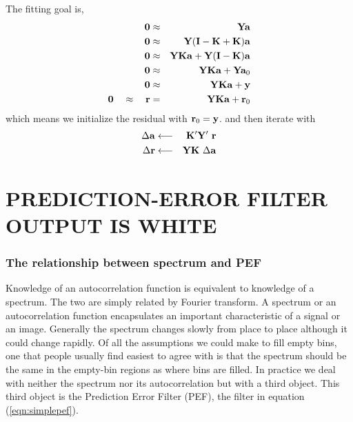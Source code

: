 The fitting goal is,
\begin{eqnarray}
\bold 0  &\approx & \bold Y                          \bold a            \\
\bold 0  &\approx & \bold Y(\bold I-\bold K+\bold K) \bold a            \\
\bold 0  &\approx & \bold Y\bold K\bold a +\bold Y(\bold I-\bold K)\bold a \\
\bold 0  &\approx & \bold Y\bold K\bold a +\bold Y \bold a_0 \\
\bold 0  &\approx & \bold Y\bold K\bold a +\bold y           \\
                                        \bold 0  \quad\approx\quad
\bold r  &=       & \bold Y\bold K\bold a +\bold r_0
\label{eqn:pefregression}
\end{eqnarray}
which means we initialize the residual with
$ \bold r_0 = \bold y$.
and then iterate with
\begin{eqnarray}
\Delta \bold a    &\longleftarrow& \bold K' \bold Y'\        \bold r \\
\Delta \bold r    &\longleftarrow& \bold Y  \bold K \ \Delta \bold a 
\end{eqnarray}



\section{PREDICTION-ERROR FILTER OUTPUT IS WHITE}

\subsubsection{The relationship between spectrum and PEF}
Knowledge of an autocorrelation function
is equivalent to knowledge of a spectrum.
The two are simply related by Fourier transform.
A spectrum or an autocorrelation function encapsulates
an important characteristic of a signal or an image.
Generally the spectrum changes slowly from place to place
although it could change rapidly.
Of all the assumptions we could make to fill empty bins,
one that people usually find easiest to agree with is that
the spectrum should be the same
in the empty-bin regions as where bins are filled.
In practice we deal with neither the spectrum
nor its autocorrelation but with a third object.
This third object is the Prediction Error Filter (PEF),
the filter in equation (\ref{eqn:simplepef}).

